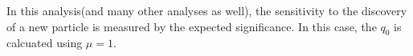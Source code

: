 In this analysis(and many other analyses as well), 
the sensitivity to the discovery of a new particle is 
measured by the expected significance. In this case, the $q_0$ 
is calcuated using $\mu = 1$.



